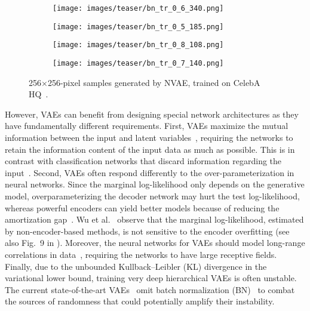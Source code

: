 \documentclass{article}
\begin{document}
\begin{figure}[!h]
\centering
\hspace{-0.2cm}
\begin{subfigure}[b]{.24\textwidth}
\centering
\texttt{[image: images/teaser/bn\_tr\_0\_6\_340.png]}
\end{subfigure}
\begin{subfigure}[b]{.24\textwidth}
\centering
\texttt{[image: images/teaser/bn\_tr\_0\_5\_185.png]}
\end{subfigure}
\begin{subfigure}[b]{.24\textwidth}
\centering
\texttt{[image: images/teaser/bn\_tr\_0\_8\_108.png]}
\end{subfigure}
\begin{subfigure}[b]{.24\textwidth}
\centering
\texttt{[image: images/teaser/bn\_tr\_0\_7\_140.png]}
\end{subfigure}

\caption{256$\times$256-pixel samples generated by NVAE, trained on CelebA HQ~\cite{karras2018progressive}.}
\label{fig:teaser}
\vspace{-0.3cm}
\end{figure} 
However, VAEs can benefit from designing special network architectures as they have fundamentally different requirements. First, VAEs maximize the mutual information between the input and latent variables~\cite{barber2004IM, alemi2016info}, requiring the networks to retain the information content of the input data as much as possible. This is in contrast with classification networks that discard information regarding the input~\cite{shwartz2017IB}. Second, VAEs often respond differently to the over-parameterization in neural networks. Since the marginal log-likelihood only depends on the generative model, overparameterizing the decoder network may hurt the test log-likelihood, whereas powerful encoders can yield better models because of reducing the amortization gap~\cite{cremer18amortization}. Wu et al.~\cite{wu2016quantitative} observe that the marginal log-likelihood, estimated by non-encoder-based methods, is not 
sensitive to the encoder overfitting (see also Fig.~9 in \cite{rolfe2016discrete}).
Moreover, the neural networks for VAEs should model long-range correlations in data~\cite{dieleman2018longrange, chen2018pixelsnail, sadeghi2019pixelvae++}, requiring the networks to have large receptive fields. Finally, due to the unbounded Kullback–Leibler (KL) divergence in the variational lower bound, training very deep hierarchical VAEs is often unstable. The current state-of-the-art VAEs~\cite{kingma2016improved, maaloe2019biva} omit batch normalization (BN)~\cite{ioffe2015batch} to combat the sources of randomness that could potentially amplify their instability. 
\end{document}
